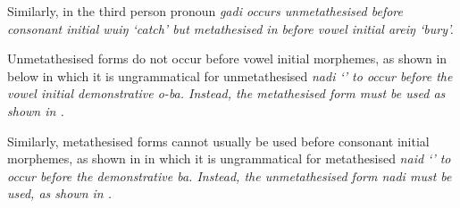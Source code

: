 Similarly, in  the third person
pronoun \it{gadi} occurs unmetathesised
before consonant initial \it{wuiŋ} `catch' but metathesised
in  before vowel initial \it{areiŋ} `bury'.

\begin{exe}
\let\eachwordone=\it
	\label{ex:gadi}
	\label{ex:gaid}
\end{exe}

Unmetathesised forms do not occur before vowel initial
morphemes, as shown in  below in which it
is ungrammatical for unmetathesised \it{nadi} `'
to occur before the vowel initial demonstrative \it{o-ba}.
Instead, the metathesised form must be used as shown in .

\begin{exe}
\let\eachwordone=\it
	\label{ex:naid}
\end{exe}

Similarly, metathesised forms cannot usually be used before
consonant initial morphemes, as shown in 
in which it is ungrammatical for metathesised \it{naid} `'
to occur before the demonstrative \it{ba}.
Instead, the unmetathesised form \it{nadi} must be used,
as shown in .

\begin{exe}
\let\eachwordone=\it
\end{exe}

